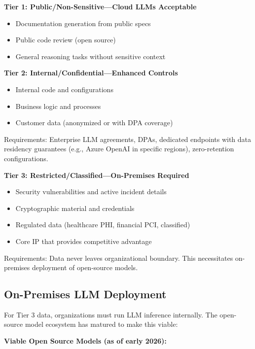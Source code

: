 \textbf{Tier 1: Public/Non-Sensitive---Cloud LLMs Acceptable}
\begin{itemize}
    \item Documentation generation from public specs
    \item Public code review (open source)
    \item General reasoning tasks without sensitive context
\end{itemize}

\textbf{Tier 2: Internal/Confidential---Enhanced Controls}
\begin{itemize}
    \item Internal code and configurations
    \item Business logic and processes
    \item Customer data (anonymized or with DPA coverage)
\end{itemize}

Requirements: Enterprise LLM agreements, DPAs, dedicated endpoints with data residency guarantees (e.g., Azure OpenAI in specific regions), zero-retention configurations.

\textbf{Tier 3: Restricted/Classified---On-Premises Required}
\begin{itemize}
    \item Security vulnerabilities and active incident details
    \item Cryptographic material and credentials
    \item Regulated data (healthcare PHI, financial PCI, classified)
    \item Core IP that provides competitive advantage
\end{itemize}

Requirements: Data never leaves organizational boundary. This necessitates on-premises deployment of open-source models.

\subsection{On-Premises LLM Deployment}
\label{subsec:on-premises}

For Tier 3 data, organizations must run LLM inference internally. The open-source model ecosystem has matured to make this viable:

\textbf{Viable Open Source Models (as of early 2026):}

